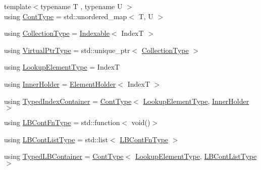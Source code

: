 \begin{DoxyCompactItemize}
\item 
{\footnotesize template$<$typename T , typename U $>$ }\\using \hyperlink{structvt_1_1vrt_1_1collection_1_1_holder_a89a4952463fceb239ce3415304526dc9}{Cont\+Type} = std\+::unordered\+\_\+map$<$ T, U $>$
\item 
using \hyperlink{structvt_1_1vrt_1_1collection_1_1_holder_ad940337a70ac576f960ea2d22a33f290}{Collection\+Type} = \hyperlink{structvt_1_1vrt_1_1collection_1_1_indexable}{Indexable}$<$ IndexT $>$
\item 
using \hyperlink{structvt_1_1vrt_1_1collection_1_1_holder_a0a7eb9b25e205e5d113ec13964547a8e}{Virtual\+Ptr\+Type} = std\+::unique\+\_\+ptr$<$ \hyperlink{structvt_1_1vrt_1_1collection_1_1_holder_ad940337a70ac576f960ea2d22a33f290}{Collection\+Type} $>$
\item 
using \hyperlink{structvt_1_1vrt_1_1collection_1_1_holder_a619f5acc2501a0d3f69cca99f89e72fd}{Lookup\+Element\+Type} = IndexT
\item 
using \hyperlink{structvt_1_1vrt_1_1collection_1_1_holder_a6c93d243ae88f38a8c5f8aa3a1ad86d8}{Inner\+Holder} = \hyperlink{structvt_1_1vrt_1_1collection_1_1_element_holder}{Element\+Holder}$<$ IndexT $>$
\item 
using \hyperlink{structvt_1_1vrt_1_1collection_1_1_holder_a7f238e98ee835799bc876c180a226b0d}{Typed\+Index\+Container} = \hyperlink{structvt_1_1vrt_1_1collection_1_1_holder_a89a4952463fceb239ce3415304526dc9}{Cont\+Type}$<$ \hyperlink{structvt_1_1vrt_1_1collection_1_1_holder_a619f5acc2501a0d3f69cca99f89e72fd}{Lookup\+Element\+Type}, \hyperlink{structvt_1_1vrt_1_1collection_1_1_holder_a6c93d243ae88f38a8c5f8aa3a1ad86d8}{Inner\+Holder} $>$
\item 
using \hyperlink{structvt_1_1vrt_1_1collection_1_1_holder_a1f897dfd5f4e29e997533aeefe7b252d}{L\+B\+Cont\+Fn\+Type} = std\+::function$<$ void()$>$
\item 
using \hyperlink{structvt_1_1vrt_1_1collection_1_1_holder_a4a738b6b6c2216d7a5b528956502172a}{L\+B\+Cont\+List\+Type} = std\+::list$<$ \hyperlink{structvt_1_1vrt_1_1collection_1_1_holder_a1f897dfd5f4e29e997533aeefe7b252d}{L\+B\+Cont\+Fn\+Type} $>$
\item 
using \hyperlink{structvt_1_1vrt_1_1collection_1_1_holder_a299791b3df9ee801283b1ca8ed24433b}{Typed\+L\+B\+Container} = \hyperlink{structvt_1_1vrt_1_1collection_1_1_holder_a89a4952463fceb239ce3415304526dc9}{Cont\+Type}$<$ \hyperlink{structvt_1_1vrt_1_1collection_1_1_holder_a619f5acc2501a0d3f69cca99f89e72fd}{Lookup\+Element\+Type}, \hyperlink{structvt_1_1vrt_1_1collection_1_1_holder_a4a738b6b6c2216d7a5b528956502172a}{L\+B\+Cont\+List\+Type} $>$

\end{DoxyCompactItemize}
